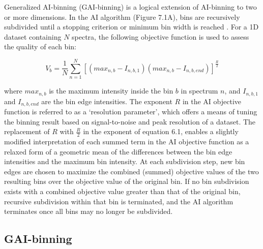 \begin{doublespace}
Generalized AI-binning (GAI-binning) is a logical extension of AI-binning to
two or more dimensions. In the AI algorithm (Figure 7.1A), bins are recursively
subdivided until a stopping criterion or minimum bin width is reached
\cite{demeyer:anchem2008}. For a 1D dataset containing $N$ spectra,
the following objective function is used to assess the quality of each bin:

\begin{equation}
V_b = \frac{1}{N}
  \sum_{n=1}^N \left[
    (max_{n,b} - I_{n,b,1})
    (max_{n,b} - I_{n,b,end}) \right]^\frac{R}{2}
\end{equation}

where $max_{n,b}$ is the maximum intensity inside the bin $b$ in spectrum $n$,
and $I_{n,b,1}$ and $I_{n,b,end}$ are the bin edge intensities. The exponent
$R$ in the AI objective function is referred to as a `resolution parameter',
which offers a means of tuning the binning result based on signal-to-noise and
peak resolution of a dataset. The replacement of $R$ with $\frac{R}{2}$ in the
exponent of equation 6.1, enables a slightly modified interpretation of each
summed term in the AI objective function as a relaxed form of a geometric mean
of the differences between the bin edge intensities and the maximum bin
intensity. At each subdivision step, new bin edges are chosen to maximize the
combined (summed) objective values of the two resulting bins over the objective
value of the original bin. If no bin subdivision exists with a combined
objective value greater than that of the original bin, recursive subdivision
within that bin is terminated, and the AI algorithm terminates once all bins
may no longer be subdivided.
\end{doublespace}

\subsection{GAI-binning}

